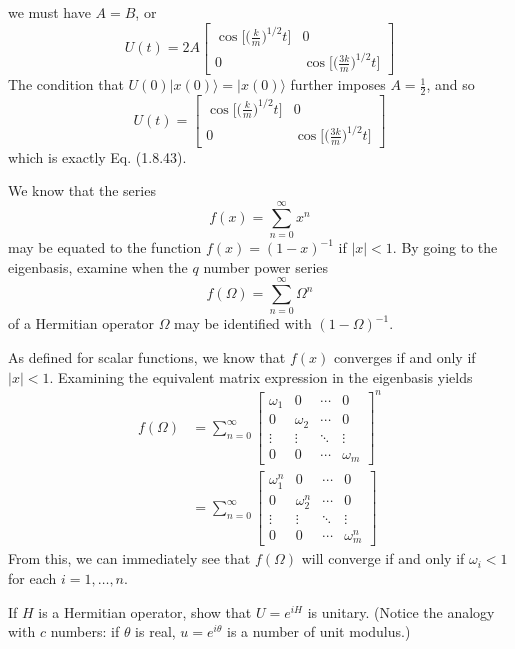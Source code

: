 \documentclass[../principles-of-quantum-mechanics.tex]{subfiles}
\begin{document}
\begin{questions}
\begin{solution}
\[	\]
	we must have $A = B$, or
	\[
		U(t) = 2A\begin{bmatrix}
			\cos\Big[\Big(\frac{k}{m}\Big)^{1/2}t\Big] & 0 \\
			0 & \cos\Big[\Big(\frac{3k}{m}\Big)^{1/2}t\Big]
		\end{bmatrix}
	\]
	The condition that $U(0)|x(0)\rangle = |x(0)\rangle$ further imposes $A = \frac{1}{2}$, and so
	\[
		U(t) = \begin{bmatrix}
		\cos\Big[\Big(\frac{k}{m}\Big)^{1/2}t\Big] & 0 \\
		0 & \cos\Big[\Big(\frac{3k}{m}\Big)^{1/2}t\Big]
		\end{bmatrix}
	\]
	which is exactly Eq. (1.8.43).
\end{solution}

\question We know that the series
\[
	f(x) = \sum_{n=0}^{\infty}x^n
\]
may be equated to the function $f(x) = (1-x)^{-1}$ if $|x|<1$. By going to the eigenbasis, examine when the $q$ number power series
\[
	f(\Omega) = \sum_{n=0}^{\infty}\Omega^n
\]
of a Hermitian operator $\Omega$ may be identified with $(1 - \Omega)^{-1}$.

\begin{solution}
	As defined for scalar functions, we know that $f(x)$ converges if and only if $|x|<1$. Examining the equivalent matrix expression in the eigenbasis yields
	\begin{align*}
		f(\Omega) &= \sum_{n=0}^{\infty}\begin{bmatrix}
			\omega_1 & 0 & \cdots & 0 \\
			0 & \omega_2 & \cdots & 0 \\
			\vdots & \vdots & \ddots & \vdots \\
			0 & 0 & \cdots & \omega_m
		\end{bmatrix}^n \\
		&= \sum_{n=0}^{\infty}\begin{bmatrix}
		\omega_1^n & 0 & \cdots & 0 \\
		0 & \omega_2^n & \cdots & 0 \\
		\vdots & \vdots & \ddots & \vdots \\
		0 & 0 & \cdots & \omega_m^n
	\end{bmatrix}
	\end{align*}
	From this, we can immediately see that $f(\Omega)$ will converge if and only if $\omega_i<1$ for each $i=1,\dots,n$.
\end{solution}

\question If $H$ is a Hermitian operator, show that $U=e^{iH}$ is unitary. (Notice the analogy with $c$ numbers: if $\theta$ is real, $u=e^{i\theta}$ is a number of unit modulus.)


\end{questions}
\end{document}
